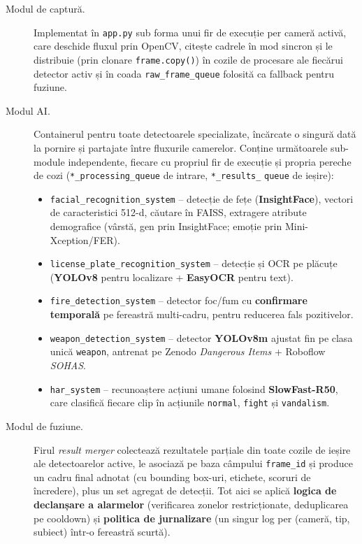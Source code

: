 \documentclass[../../main.tex]{subfiles}
\begin{document}
\begin{description}
    \item[Modul de captură.] Implementat în \texttt{app.py} sub forma unui fir de execuție per cameră activă, care deschide fluxul prin OpenCV, citește cadrele în mod sincron și le distribuie (prin clonare \texttt{frame.copy()}) în cozile de procesare ale fiecărui detector activ și în coada \texttt{raw\_frame\_queue} folosită ca fallback pentru fuziune.

    \item[Modul AI.] Containerul pentru toate detectoarele specializate, încărcate o singură dată la pornire și partajate între fluxurile camerelor. Conține următoarele sub-module independente, fiecare cu propriul fir de execuție și propria pereche de cozi (\texttt{*\_processing\_queue} de intrare, \texttt{*\_results\_} \texttt{queue} de ieșire):
    \begin{itemize}
        \item \texttt{facial\_recognition\_system} -- detecție de fețe (\textbf{InsightFace}), \linebreak vectori de caracteristici 512-d, căutare în FAISS, extragere atribute demografice (vârstă, gen prin InsightFace; emoție prin \linebreak Mini-Xception/FER).
        \item \texttt{license\_plate\_recognition\_system} -- detecție și OCR pe plăcuțe (\textbf{YOLOv8} pentru localizare + \textbf{EasyOCR} pentru text).
        \item \texttt{fire\_detection\_system} -- detector foc/fum cu \textbf{confirmare temporală} pe fereastră multi-cadru, pentru reducerea fals pozitivelor.
        \item \texttt{weapon\_detection\_system} -- detector \textbf{YOLOv8m} ajustat fin pe clasa unică \texttt{weapon}, antrenat pe Zenodo \emph{Dangerous Items} + Roboflow \emph{SOHAS}.
        \item \texttt{har\_system} -- recunoaștere acțiuni umane folosind \textbf{SlowFast-R50}, care clasifică fiecare clip în acțiunile \texttt{normal}, \texttt{fight} și \texttt{vandalism}.
    \end{itemize}

    \item[Modul de fuziune.] Firul \emph{result merger} colectează rezultatele parțiale din toate cozile de ieșire ale detectoarelor active, le asociază pe baza câmpului \texttt{frame\_id} și produce un cadru final adnotat (cu bounding box-uri, etichete, scoruri de încredere), plus un set agregat de detecții. Tot aici se aplică \textbf{logica de declanșare a alarmelor} (verificarea zonelor restricționate, deduplicarea pe cooldown) și \textbf{politica de jurnalizare} (un singur log per (cameră, tip, subiect) într-o fereastră scurtă).


\end{description}
\end{document}
